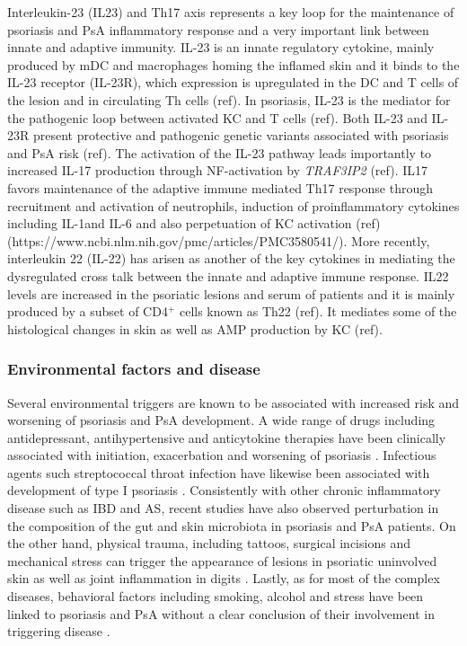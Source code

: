 Interleukin-23 (IL23) and Th17 axis represents a key loop for the maintenance of psoriasis and PsA inflammatory response and a very important link between innate and adaptive immunity. IL-23 is an innate regulatory cytokine, mainly produced by mDC and macrophages homing the inflamed skin and it binds to the IL-23 receptor (IL-23R), which expression is upregulated in the DC and T cells of the lesion and in circulating Th cells (ref). In psoriasis, IL-23 is the mediator for the pathogenic loop between activated KC and T cells (ref). Both IL-23 and IL-23R present protective and pathogenic genetic variants associated with psoriasis and PsA risk (ref). The activation of the IL-23 pathway leads importantly to increased IL-17 production through NF-\kappaB activation by \textit{TRAF3IP2} (ref). IL17 favors maintenance of the adaptive immune mediated Th17 response through recruitment and activation of neutrophils, induction of proinflammatory cytokines including IL-1\beta and IL-6 and also perpetuation of KC activation (ref) (https://www.ncbi.nlm.nih.gov/pmc/articles/PMC3580541/). %
More recently, interleukin 22 (IL-22) has arisen as another of the key cytokines in mediating the dysregulated cross talk between the innate and adaptive immune response. IL22 levels are increased in the psoriatic lesions and serum of patients and it is mainly produced by a subset of CD4$^+$ cells known as Th22 (ref). It mediates some of the histological changes in skin as well as AMP production by KC (ref).


\subsubsection{Environmental factors and disease}

Several environmental triggers are known to be associated with increased risk and worsening of psoriasis and PsA development. A wide range of drugs including antidepressant, antihypertensive and anticytokine therapies have been clinically associated with initiation, exacerbation and worsening of psoriasis \parencite{Kim2010}. Infectious agents such streptococcal throat infection have likewise been associated with development of type I psoriasis \parencite{Gudjonsson2003,Valdimarsson2009, Diluvio2006}. Consistently with other chronic inflammatory disease such as IBD and AS, recent studies have also observed perturbation in the composition of the gut and skin microbiota in psoriasis and PsA patients. On the other hand, physical trauma, including tattoos, surgical incisions and mechanical stress can trigger the appearance of lesions in psoriatic uninvolved skin as well as joint inflammation in digits \parencite {Weiss2002,Nestle2009}. Lastly, as for most of the complex diseases, behavioral factors including smoking, alcohol and stress have been linked to psoriasis and PsA without a clear conclusion of their involvement in triggering disease \parencite{Meglio2014}.

